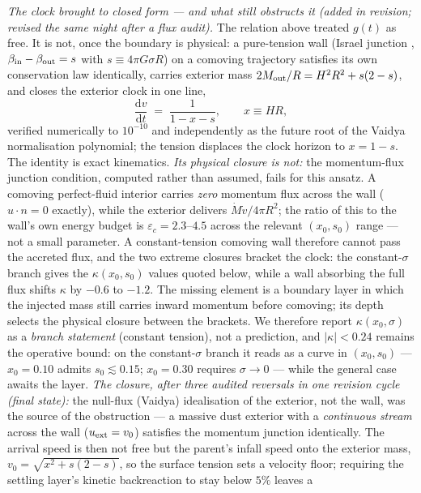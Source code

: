 \documentclass[11pt]{article}
\begin{document}
\emph{The clock brought to closed form --- and what still obstructs it (added in revision; revised the same night after a flux audit).} The relation above treated
$g(t)$ as free. It is not, once the boundary is physical: a pure-tension wall (Israel junction \cite{Israel1966,BKT1987,BGG1987},
$\beta_{\rm in}-\beta_{\rm out} = s$ with $s \equiv 4\pi G\sigma R$) on a comoving trajectory
satisfies its own conservation law identically, carries exterior mass
$2M_{\rm out}/R = H^2R^2 + s(2-s)$, and closes the exterior clock in one line,
\[
\frac{\mathrm{d}v}{\mathrm{d}t} \;=\; \frac{1}{1 - x - s}, \qquad x \equiv HR,
\]
verified numerically to $10^{-10}$ and independently as the future root of the Vaidya
normalisation polynomial; the tension displaces the clock horizon to $x = 1-s$. The identity is
exact kinematics. \emph{Its physical closure is not:} the momentum-flux junction condition,
computed rather than assumed, fails for this ansatz. A comoving perfect-fluid interior carries
\emph{zero} momentum flux across the wall ($u \cdot n = 0$ exactly), while the exterior delivers
$\dot M \dot v / 4\pi R^2$; the ratio of this to the wall's own energy budget is
$\varepsilon_c = 2.3$--$4.5$ across the relevant $(x_0,s_0)$ range --- not a small parameter.
A constant-tension comoving wall therefore cannot pass the accreted flux, and the two extreme
closures bracket the clock: the constant-$\sigma$ branch gives the $\kappa(x_0,s_0)$ values
quoted below, while a wall absorbing the full flux shifts $\kappa$ by $-0.6$ to $-1.2$. The
missing element is a boundary layer in which the injected mass still carries inward momentum
before comoving; its depth selects the physical closure between the brackets. We therefore
report $\kappa(x_0,\sigma)$ as a \emph{branch statement} (constant tension), not a prediction,
and $|\kappa| < 0.24$ remains the operative bound: on the constant-$\sigma$ branch it reads as
a curve in $(x_0, s_0)$ --- $x_0 = 0.10$ admits $s_0 \lesssim 0.15$; $x_0 = 0.30$ requires
$\sigma \to 0$ --- while the general case awaits the layer. \emph{The closure, after three audited reversals in one revision cycle (final state):} the
null-flux (Vaidya) idealisation of the exterior, not the wall, was the source of the obstruction
--- a massive dust exterior with a \emph{continuous stream} across the wall ($u_{\rm ext} = v_0$)
satisfies the momentum junction identically. The arrival speed is then not free but the parent's
infall speed onto the exterior mass, $v_0 = \sqrt{x^2 + s(2-s)}$, so the surface tension sets a
velocity floor; requiring the settling layer's kinetic backreaction to stay below $5\%$ leaves a
\end{document}
